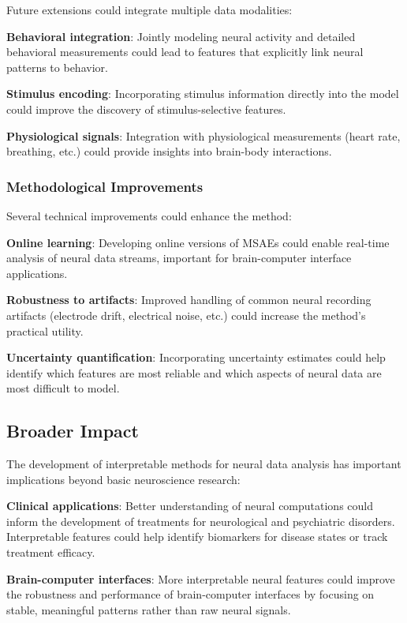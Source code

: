 Future extensions could integrate multiple data modalities:

\textbf{Behavioral integration}: Jointly modeling neural activity and detailed behavioral measurements could lead to features that explicitly link neural patterns to behavior.

\textbf{Stimulus encoding}: Incorporating stimulus information directly into the model could improve the discovery of stimulus-selective features.

\textbf{Physiological signals}: Integration with physiological measurements (heart rate, breathing, etc.) could provide insights into brain-body interactions.

\subsubsection{Methodological Improvements}

Several technical improvements could enhance the method:

\textbf{Online learning}: Developing online versions of MSAEs could enable real-time analysis of neural data streams, important for brain-computer interface applications.

\textbf{Robustness to artifacts}: Improved handling of common neural recording artifacts (electrode drift, electrical noise, etc.) could increase the method's practical utility.

\textbf{Uncertainty quantification}: Incorporating uncertainty estimates could help identify which features are most reliable and which aspects of neural data are most difficult to model.

\subsection{Broader Impact}

The development of interpretable methods for neural data analysis has important implications beyond basic neuroscience research:

\textbf{Clinical applications}: Better understanding of neural computations could inform the development of treatments for neurological and psychiatric disorders. Interpretable features could help identify biomarkers for disease states or track treatment efficacy.

\textbf{Brain-computer interfaces}: More interpretable neural features could improve the robustness and performance of brain-computer interfaces by focusing on stable, meaningful patterns rather than raw neural signals.

